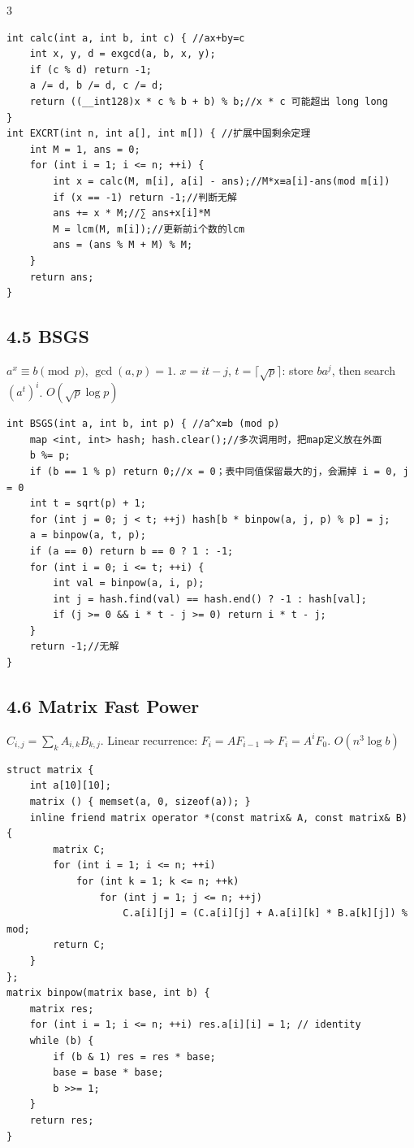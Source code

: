 \documentclass[8pt]{extarticle}
\begin{document}
\begin{multicols*}{3}
\begin{lstlisting}
int calc(int a, int b, int c) { //ax+by=c
    int x, y, d = exgcd(a, b, x, y);
    if (c % d) return -1;
    a /= d, b /= d, c /= d;
    return ((__int128)x * c % b + b) % b;//x * c 可能超出 long long
}
int EXCRT(int n, int a[], int m[]) { //扩展中国剩余定理
    int M = 1, ans = 0;
    for (int i = 1; i <= n; ++i) {
        int x = calc(M, m[i], a[i] - ans);//M*x≡a[i]-ans(mod m[i])
        if (x == -1) return -1;//判断无解
        ans += x * M;//∑ ans+x[i]*M
        M = lcm(M, m[i]);//更新前i个数的lcm
        ans = (ans % M + M) % M;
    }
    return ans;
}
\end{lstlisting}

\subsection*{4.5 BSGS}

$a^x \equiv b \pmod p$, $\gcd(a, p) = 1$. $x = it - j$, $t = \lceil \sqrt p \rceil$: store $b a^j$, then search $(a^t)^i$. $O(\sqrt p \log p)$


\begin{lstlisting}
int BSGS(int a, int b, int p) { //a^x≡b (mod p)
    map <int, int> hash; hash.clear();//多次调用时，把map定义放在外面
    b %= p;
    if (b == 1 % p) return 0;//x = 0；表中同值保留最大的j，会漏掉 i = 0, j = 0
    int t = sqrt(p) + 1;
    for (int j = 0; j < t; ++j) hash[b * binpow(a, j, p) % p] = j;
    a = binpow(a, t, p);
    if (a == 0) return b == 0 ? 1 : -1;
    for (int i = 0; i <= t; ++i) {
        int val = binpow(a, i, p);
        int j = hash.find(val) == hash.end() ? -1 : hash[val];
        if (j >= 0 && i * t - j >= 0) return i * t - j;
    }
    return -1;//无解
}
\end{lstlisting}

\subsection*{4.6 Matrix Fast Power}

$C_{i,j} = \sum_k A_{i,k} B_{k,j}$. Linear recurrence: $F_i = A F_{i-1} \Rightarrow F_i = A^i F_0$. $O(n^3 \log b)$


\begin{lstlisting}
struct matrix {
    int a[10][10];
    matrix () { memset(a, 0, sizeof(a)); }
    inline friend matrix operator *(const matrix& A, const matrix& B) {
        matrix C;
        for (int i = 1; i <= n; ++i)
            for (int k = 1; k <= n; ++k)
                for (int j = 1; j <= n; ++j)
                    C.a[i][j] = (C.a[i][j] + A.a[i][k] * B.a[k][j]) % mod;
        return C;
    }
}; 
matrix binpow(matrix base, int b) {
    matrix res;
    for (int i = 1; i <= n; ++i) res.a[i][i] = 1; // identity
    while (b) {
        if (b & 1) res = res * base;
        base = base * base;
        b >>= 1;
    }
    return res;
}
\end{lstlisting}


\end{multicols*}
\end{document}
